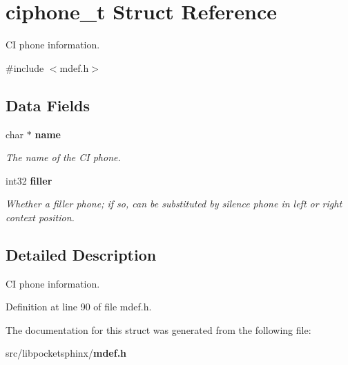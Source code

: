 \section{ciphone\-\_\-t Struct Reference}
\label{structciphone__t}


C\-I phone information.  




{\ttfamily \#include $<$mdef.\-h$>$}

\subsection*{Data Fields}
\begin{DoxyCompactItemize}
\item 
char $\ast$ {\bf name}\label{structciphone__t_a2327c5f09fa245c25926c718fdab642d}

\begin{DoxyCompactList}\small\item\em The name of the C\-I phone. \end{DoxyCompactList}\item 
int32 {\bf filler}\label{structciphone__t_a96e20b175c00c4edcd75d922dba067cd}

\begin{DoxyCompactList}\small\item\em Whether a filler phone; if so, can be substituted by silence phone in left or right context position. \end{DoxyCompactList}\end{DoxyCompactItemize}


\subsection{Detailed Description}
C\-I phone information. 

Definition at line 90 of file mdef.\-h.



The documentation for this struct was generated from the following file\-:\begin{DoxyCompactItemize}
\item 
src/libpocketsphinx/{\bf mdef.\-h}\end{DoxyCompactItemize}
